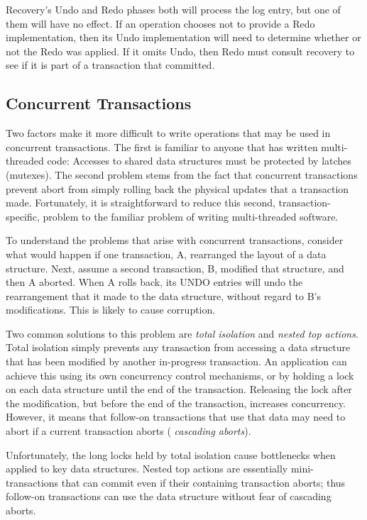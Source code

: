 \documentclass[letterpaper,twocolumn,10pt]{article}
\begin{document}
Recovery's Undo and Redo phases both will process the log entry, but
one of them will have no effect.  If an operation chooses not to
provide a Redo implementation, then its Undo implementation will need
to determine whether or not the Redo was applied.  If it omits Undo,
then Redo must consult recovery to see if it is part of a transaction that
committed.

\subsection{Concurrent Transactions}

Two factors make it more difficult to write operations that may be
used in concurrent transactions.  The first is familiar to anyone that
has written multi-threaded code: Accesses to shared data structures
must be protected by latches (mutexes).  The second problem stems from
the fact that concurrent transactions prevent abort from simply
rolling back the physical updates that a transaction made.
Fortunately, it is straightforward to reduce this second,
transaction-specific, problem to the familiar problem of writing
multi-threaded software.

To understand the problems that arise with concurrent transactions,
consider what would happen if one transaction, A, rearranged the
layout of a data structure.  Next, assume a second transaction, B,
modified that structure, and then A aborted.  When A rolls back, its
UNDO entries will undo the rearrangement that it made to the data
structure, without regard to B's modifications.  This is likely to
cause corruption.

Two common solutions to this problem are {\em total isolation} and
{\em nested top actions}.  Total isolation simply prevents any
transaction from accessing a data structure that has been modified by
another in-progress transaction.  An application can achieve this
using its own concurrency control mechanisms, or by holding a lock on
each data structure until the end of the transaction.  Releasing the
lock after the modification, but before the end of the transaction,
increases concurrency.  However, it means that follow-on transactions that use
that data may need to abort if a current transaction aborts ({\em
cascading aborts}).  %

Unfortunately, the long locks held by total isolation cause bottlenecks when applied to key
data structures.
Nested top actions are essentially mini-transactions that can
commit even if their containing transaction aborts; thus follow-on
transactions can use the data structure without fear of cascading
aborts.  
\end{document}
